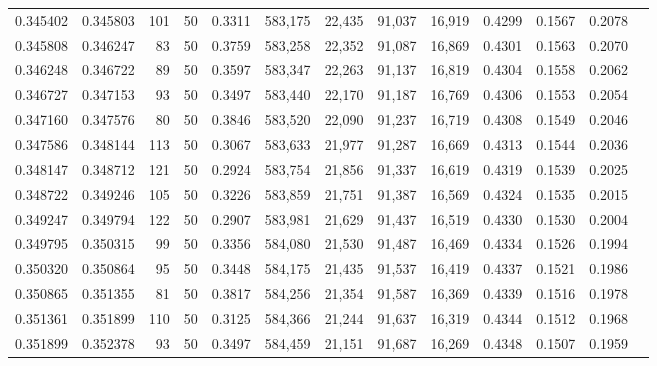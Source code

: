 \begin{tabular}{rrrrrrrrrrrrr}
0.345402 & 0.345803 &   101 &  50 &                                     0.3311 & 583,175 &  22,435 &  91,037 &  16,919 & 0.4299 & 0.1567 & 0.2078 \\
0.345808 & 0.346247 &    83 &  50 &                                     0.3759 & 583,258 &  22,352 &  91,087 &  16,869 & 0.4301 & 0.1563 & 0.2070 \\
0.346248 & 0.346722 &    89 &  50 &                                     0.3597 & 583,347 &  22,263 &  91,137 &  16,819 & 0.4304 & 0.1558 & 0.2062 \\
0.346727 & 0.347153 &    93 &  50 &                                     0.3497 & 583,440 &  22,170 &  91,187 &  16,769 & 0.4306 & 0.1553 & 0.2054 \\
0.347160 & 0.347576 &    80 &  50 &                                     0.3846 & 583,520 &  22,090 &  91,237 &  16,719 & 0.4308 & 0.1549 & 0.2046 \\
0.347586 & 0.348144 &   113 &  50 &                                     0.3067 & 583,633 &  21,977 &  91,287 &  16,669 & 0.4313 & 0.1544 & 0.2036 \\
0.348147 & 0.348712 &   121 &  50 &                                     0.2924 & 583,754 &  21,856 &  91,337 &  16,619 & 0.4319 & 0.1539 & 0.2025 \\
0.348722 & 0.349246 &   105 &  50 &                                     0.3226 & 583,859 &  21,751 &  91,387 &  16,569 & 0.4324 & 0.1535 & 0.2015 \\
0.349247 & 0.349794 &   122 &  50 &                                     0.2907 & 583,981 &  21,629 &  91,437 &  16,519 & 0.4330 & 0.1530 & 0.2004 \\
0.349795 & 0.350315 &    99 &  50 &                                     0.3356 & 584,080 &  21,530 &  91,487 &  16,469 & 0.4334 & 0.1526 & 0.1994 \\
0.350320 & 0.350864 &    95 &  50 &                                     0.3448 & 584,175 &  21,435 &  91,537 &  16,419 & 0.4337 & 0.1521 & 0.1986 \\
0.350865 & 0.351355 &    81 &  50 &                                     0.3817 & 584,256 &  21,354 &  91,587 &  16,369 & 0.4339 & 0.1516 & 0.1978 \\
0.351361 & 0.351899 &   110 &  50 &                                     0.3125 & 584,366 &  21,244 &  91,637 &  16,319 & 0.4344 & 0.1512 & 0.1968 \\
0.351899 & 0.352378 &    93 &  50 &                                     0.3497 & 584,459 &  21,151 &  91,687 &  16,269 & 0.4348 & 0.1507 & 0.1959 \\

\end{tabular}

